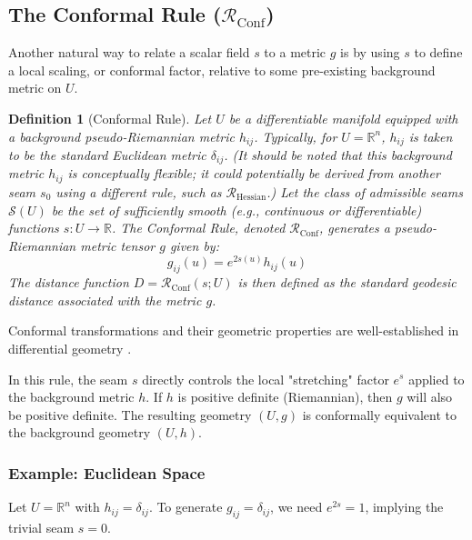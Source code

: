 \documentclass[twoside,twocolumn]{article}
\newtheorem{definition}{Definition}[subsection]
\numberwithin{equation}{section} %
\begin{document}
\subsection{The Conformal Rule ($\mathcal{R}_{\text{Conf}}$)}
\setcounter{definition}{0}

Another natural way to relate a scalar field $s$ to a metric $g$ is by using $s$ to define a local scaling, or conformal factor, relative to some pre-existing background metric on $U$.

\begin{definition}[Conformal Rule]
Let $U$ be a differentiable manifold equipped with a background pseudo-Riemannian metric $h_{ij}$. Typically, for $U=\mathbb{R}^n$, $h_{ij}$ is taken to be the standard Euclidean metric $\delta_{ij}$. (It should be noted that this background metric $h_{ij}$ is conceptually flexible; it could potentially be derived from another seam $s_0$ using a different rule, such as $\mathcal{R}_{\text{Hessian}}$.) Let the class of admissible seams $\mathcal{S}(U)$ be the set of sufficiently smooth (e.g., continuous or differentiable) functions $s: U \to \mathbb{R}$. The \emph{Conformal Rule}, denoted $\mathcal{R}_{\text{Conf}}$, generates a pseudo-Riemannian metric tensor $g$ given by:
\begin{equation}
g_{ij}(u) = e^{2s(u)} h_{ij}(u)
\label{eq:conformal_rule}
\end{equation}
The distance function $D = \mathcal{R}_{\text{Conf}}(s; U)$ is then defined as the standard geodesic distance associated with the metric $g$.
\end{definition}
Conformal transformations and their geometric properties are well-established in differential geometry \cite{Petersen2006,Lee2018}.

\noindent In this rule, the seam $s$ directly controls the local "stretching" factor $e^s$ applied to the background metric $h$. If $h$ is positive definite (Riemannian), then $g$ will also be positive definite. The resulting geometry $(U, g)$ is conformally equivalent to the background geometry $(U, h)$.

\subsubsection{Example: Euclidean Space}
Let $U = \mathbb{R}^n$ with $h_{ij} = \delta_{ij}$. To generate $g_{ij} = \delta_{ij}$, we need $e^{2s} = 1$, implying the trivial seam $s=0$.
\end{document}
